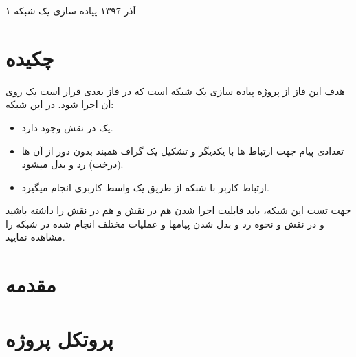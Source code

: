 \documentclass{article}
\begin{document}
    \handout
    {}
    {۱}
    {آذر ۱۳۹7}
    {پیاده سازی یک شبکه     }
    
    \vspace{0.3cm}
    \section{چکیده}
هدف این فاز از پروژه پیاده سازی یک شبکه    است که در فاز بعدی قرار است یک   روی آن اجرا شود. در این شبکه:
    \begin{itemize}
\item	یک   در نقش   وجود دارد.
\item	 تعدادی پیام جهت ارتباط   ها با یکدیگر و تشکیل یک گراف همبند بدون دور از آن ها (درخت) رد و بدل میشود. 
\item	ارتباط کاربر با شبکه از طریق یک واسط کاربری انجام میگیرد.
    \end{itemize}
جهت تست این شبکه، باید قابلیت اجرا شدن هم در نقش  و هم در نقش  را داشته باشید و در نقش  و نحوه رد و بدل شدن پیامها و عملیات مختلف انجام شده در شبکه را مشاهده نمایید.\\
    \section{مقدمه}  
  \section{پروتکل پروژه}
\end{document}
